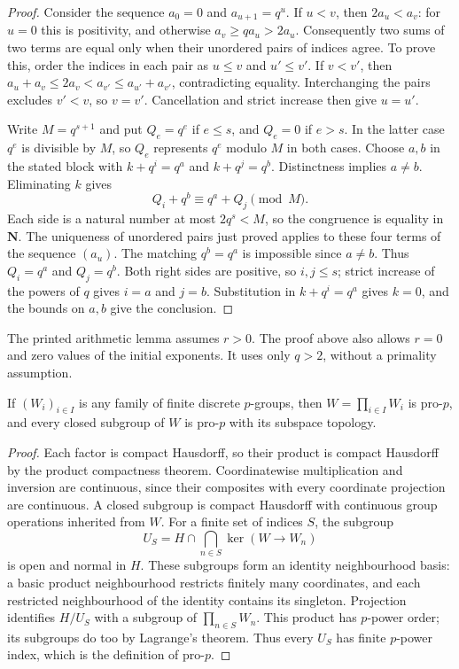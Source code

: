 \begin{proof}
Consider the sequence $a_0=0$ and $a_{u+1}=q^u$.
If $u<v$, then $2a_u<a_v$: for $u=0$ this is positivity,
and otherwise $a_v\ge qa_u>2a_u$.
Consequently two sums of two terms are equal only when their
unordered pairs of indices agree. To prove this, order the
indices in each pair as $u\le v$ and $u'\le v'$.
If $v<v'$, then $a_u+a_v\le2a_v<a_{v'}\le a_{u'}+a_{v'}$,
contradicting equality. Interchanging the pairs excludes $v'<v$,
so $v=v'$. Cancellation and strict increase then give $u=u'$.

Write $M=q^{s+1}$ and put $Q_e=q^e$ if $e\le s$, and $Q_e=0$
if $e>s$. In the latter case $q^e$ is divisible by $M$, so
$Q_e$ represents $q^e$ modulo $M$ in both cases.
Choose $a,b$ in the stated block with $k+q^i=q^a$ and
$k+q^j=q^b$. Distinctness implies $a\ne b$. Eliminating $k$
gives
\[
 Q_i+q^b\equiv q^a+Q_j\pmod M.
\]
Each side is a natural number at most $2q^s<M$, so the congruence
is equality in $\mathbf N$. The uniqueness of unordered pairs
just proved applies to these four terms of the sequence $(a_u)$.
The matching $q^b=q^a$ is impossible since $a\ne b$.
Thus $Q_i=q^a$ and $Q_j=q^b$. Both right sides are positive,
so $i,j\le s$; strict increase of the powers of $q$ gives
$i=a$ and $j=b$. Substitution in $k+q^i=q^a$ gives $k=0$,
and the bounds on $a,b$ give the conclusion.
\end{proof}

The printed arithmetic lemma assumes $r>0$. The proof above also
allows $r=0$ and zero values of the initial exponents.
It uses only $q>2$, without a primality assumption.

\begin{lemma}
\label{lem:closed-subgroup-finite-p-product}
\leanok
If $(W_i)_{i\in I}$ is any family of finite discrete $p$-groups,
then $W=\prod_{i\in I}W_i$ is pro-$p$, and every closed subgroup
of $W$ is pro-$p$ with its subspace topology.
\end{lemma}

\begin{proof}
Each factor is compact Hausdorff, so their product is compact
Hausdorff by the product compactness theorem. Coordinatewise
multiplication and inversion are continuous, since their
composites with every coordinate projection are continuous.
A closed subgroup is compact Hausdorff with continuous group
operations inherited from $W$.
For a finite set of indices $S$, the subgroup
\[
 U_S=H\cap\bigcap_{n\in S}\ker(W\longrightarrow W_n)
\]
is open and normal in $H$. These subgroups form an identity
neighbourhood basis: a basic product neighbourhood restricts
finitely many coordinates, and each restricted neighbourhood
of the identity contains its singleton.
Projection identifies $H/U_S$ with a subgroup of
$\prod_{n\in S}W_n$. This product has $p$-power order; its
subgroups do too by Lagrange's theorem. Thus every $U_S$ has
finite $p$-power index, which is the definition of pro-$p$.
\end{proof}

